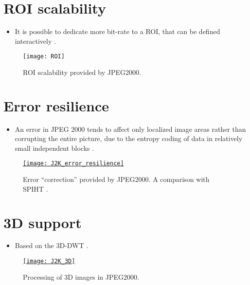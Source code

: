 \section{\acrshort{ROI} scalability}
\begin{itemize}
\item It is possible to dedicate more bit-rate to a \gls{ROI}, that
  can be defined interactively \cite{vruiz_J2K}.
\end{itemize}

\begin{figure}[H]
  \vspace{-2ex}
  \centering
  \texttt{[image: ROI]}
  \caption{\gls{ROI} scalability provided by JPEG2000.}
  \label{fig:J2K_ROI}
\end{figure}
  
\section{Error resilience}
\begin{itemize}
\item An error in JPEG 2000 tends to affect only localized image areas
  rather than corrupting the entire picture, due to the entropy coding
  of data in relatively small independent blocks
  \cite{wikipedia_J2K,brahimi2021efficient}.
\end{itemize}

\begin{figure}[H]
  \vspace{-2ex}
  \centering
  \href{https://flylib.com/books/en/2.537.1.37/1}{\texttt{[image: J2K\_error\_resilience]}}
  \caption{Error ``correction'' provided by JPEG2000. A comparison
    with \gls{SPIHT} \cite{wikipedia_SPIHT}.}
  \label{fig:J2K_error}
\end{figure}

\section{3D support}
\begin{itemize}
\item Based on the 3D-DWT \cite{Bruylants_J2K_3D}.
\end{itemize}

\begin{figure}[H]
  \vspace{-2ex}
  \centering
  \href{https://spie.org/images/Graphics/Newsroom/Imported/0779/0779_fig1.jpg}{\texttt{[image: J2K\_3D]}}
  \caption{Processing of 3D images in JPEG2000.}
  \label{fig:J2K_3D}
\end{figure}

